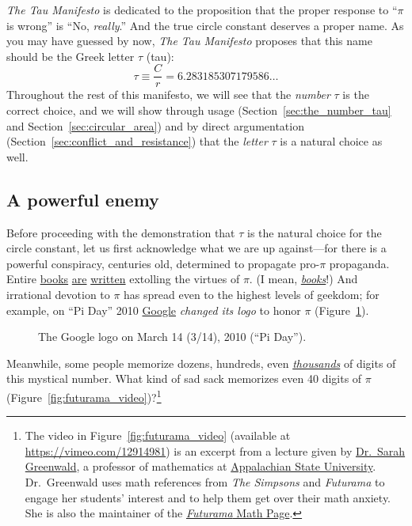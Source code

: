 \emph{The Tau Manifesto} is dedicated to the proposition that the proper response to ``$\pi$ is wrong'' is ``No, \emph{really}.'' And the true circle constant deserves a proper name. As you may have guessed by now, \emph{The Tau Manifesto} proposes that this name should be the Greek letter $\tau$ (tau):
\begin{equation}
\label{eq:tau}
\tau \equiv \frac{C}{r} = 6.283185307179586\ldots
\end{equation}
Throughout the rest of this manifesto, we will see that the \emph{number} $\tau$ is the correct choice, and we will show through usage (Section~\ref{sec:the_number_tau} and Section~\ref{sec:circular_area}) and by direct argumentation (Section~\ref{sec:conflict_and_resistance}) that the \emph{letter} $\tau$ is a natural choice as well.

\subsection{A powerful enemy} %
 \label{sec:a_powerful_enemy}

Before proceeding with the demonstration that $\tau$ is the natural choice for the circle constant, let us first acknowledge what we are up against---for there is a powerful conspiracy, centuries old, determined to propagate pro-$\pi$ propaganda. Entire \href{https://www.amazon.com/exec/obidos/ISBN=0802713327/parallaxproductiA/}{books} \href{https://www.amazon.com/Pi-Sky-Counting-Thinking-Being/dp/0198539568}{are} \href{https://www.amazon.com/exec/obidos/ISBN=0312381859/parallaxproductiA/}{written} extolling the virtues of $\pi$. (I mean, \href{https://www.amazon.com/exec/obidos/ISBN=0387989463/parallaxproductiA/}{\emph{books}}!) And irrational devotion to $\pi$ has spread even to the highest levels of geekdom; for example, on ``Pi Day'' 2010 \href{https://www.google.com/}{Google} \emph{changed its logo} to honor $\pi$  (Figure~\ref{fig:google_pi_day.}).

\begin{figure}
\begin{center}
\end{center}
\caption{The Google logo on March 14 (3/14), 2010 (``Pi Day'').\label{fig:google_pi_day.}}
\end{figure}

Meanwhile, some people memorize dozens, hundreds, even \href{https://www.guinnessworldrecords.com/world-records/most-pi-places-memorised}{\emph{thousands}} of digits of this mystical number. What kind of sad sack memorizes even 40 digits of $\pi$ (Figure~\ref{fig:futurama_video})?\footnote{The video in Figure~\ref{fig:futurama_video} (available at  \href{https://vimeo.com/12914981}{https://vimeo.com/12914981}) is an excerpt from a lecture given by \href{https://cs.appstate.edu/~sjg/}{Dr.\ Sarah Greenwald}, a professor of mathematics at \href{https://www.appstate.edu/}{Appalachian State University}. Dr.\ Greenwald uses math references from \emph{The Simpsons} and \emph{Futurama} to engage her students' interest and to help them get over their math anxiety. She is also the maintainer of the \href{https://cs.appstate.edu/~sjg/futurama/}{\emph{Futurama} Math Page}.}

